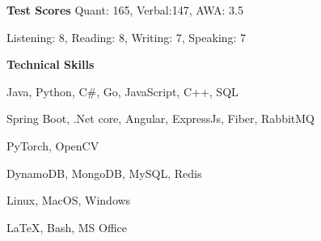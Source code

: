 \begin{rSection}{\textbf{Test Scores} }
{\bf{} \hspace{1em}}{Quant: 165, Verbal:147, AWA: 3.5} \vspace{-0.5em}

{\bf{} \hspace{1em}}{Listening: 8, Reading: 8, Writing: 7, Speaking: 7} \vspace{-0.5em}
\end{rSection}

\begin{rSection}{\textbf{Technical Skills} }
    
{\bf{} \hspace{1em}}{Java, Python, C\#, Go, JavaScript, C++, SQL} \vspace{-0.5em}

{\bf{}\hspace{1em}}{Spring Boot, .Net core, Angular, ExpressJs, Fiber, RabbitMQ} \vspace{-0.5em}

{\bf{}\hspace{1em}}{PyTorch, OpenCV} \vspace{-0.5em}

{\bf {}\hspace{1em}}{DynamoDB,  MongoDB, MySQL, Redis} \vspace{-0.5em}

{\bf {}\hspace{1em}}{Linux, MacOS, Windows} \vspace{-0.5em}

{\bf {}\hspace{1em}}{\LaTeX, Bash, MS Office} \vspace{-0.5em}

\end{rSection}


